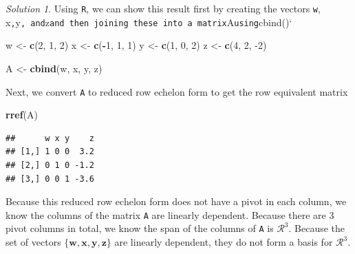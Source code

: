 \documentclass[
]{book}
\newenvironment{Shaded}{\begin{snugshade}}{\end{snugshade}}
\newcommand{\DecValTok}[1]{\textcolor[rgb]{0.00,0.00,0.81}{#1}}
\newcommand{\KeywordTok}[1]{\textcolor[rgb]{0.13,0.29,0.53}{\textbf{#1}}}
\newcommand{\NormalTok}[1]{#1}
\newcommand{\OperatorTok}[1]{\textcolor[rgb]{0.81,0.36,0.00}{\textbf{#1}}}
\newcommand{\StringTok}[1]{\textcolor[rgb]{0.31,0.60,0.02}{#1}}
\theoremstyle{definition}
\theoremstyle{definition}
\theoremstyle{definition}
\theoremstyle{remark}
\newtheorem*{solution}{Solution}
\begin{document}
\begin{solution}
Using \texttt{R}, we can show this result first by creating the vectors \texttt{w}, x\texttt{,}y\texttt{,\ and}z\texttt{and\ then\ joining\ these\ into\ a\ matrix}A\texttt{using}cbind()`

\begin{Shaded}
\begin{Highlighting}[]
\NormalTok{w <-}\StringTok{ }\KeywordTok{c}\NormalTok{(}\DecValTok{2}\NormalTok{, }\DecValTok{1}\NormalTok{, }\DecValTok{2}\NormalTok{)}
\NormalTok{x <-}\StringTok{ }\KeywordTok{c}\NormalTok{(}\OperatorTok{-}\DecValTok{1}\NormalTok{, }\DecValTok{1}\NormalTok{, }\DecValTok{1}\NormalTok{)}
\NormalTok{y <-}\StringTok{ }\KeywordTok{c}\NormalTok{(}\DecValTok{1}\NormalTok{, }\DecValTok{0}\NormalTok{, }\DecValTok{2}\NormalTok{)}
\NormalTok{z <-}\StringTok{ }\KeywordTok{c}\NormalTok{(}\DecValTok{4}\NormalTok{, }\DecValTok{2}\NormalTok{, }\DecValTok{-2}\NormalTok{)}

\NormalTok{A <-}\StringTok{ }\KeywordTok{cbind}\NormalTok{(w, x, y, z)}
\end{Highlighting}
\end{Shaded}

Next, we convert \texttt{A} to reduced row echelon form to get the row equivalent matrix

\begin{Shaded}
\begin{Highlighting}[]
\KeywordTok{rref}\NormalTok{(A)}
\end{Highlighting}
\end{Shaded}

\begin{verbatim}
##      w x y    z
## [1,] 1 0 0  3.2
## [2,] 0 1 0 -1.2
## [3,] 0 0 1 -3.6
\end{verbatim}

Because this reduced row echelon form does not have a pivot in each column, we know the columns of the matrix \texttt{A} are linearly dependent. Because there are 3 pivot columns in total, we know the span of the columns of \texttt{A} is \(\mathcal{R}^3\). Because the set of vectors \(\{ \mathbf{w}, \mathbf{x}, \mathbf{y}, \mathbf{z} \}\) are linearly dependent, they do not form a basis for \(\mathcal{R}^3\).

\end{solution}
\end{document}
